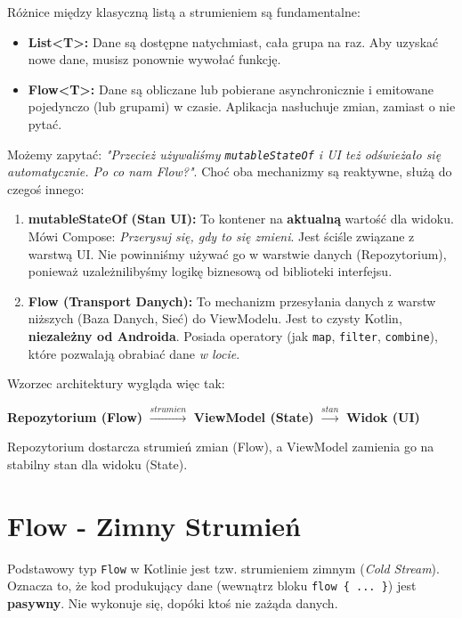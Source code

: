 Różnice między klasyczną listą a strumieniem są fundamentalne:
\begin{itemize}
    \item \textbf{List<T>:} Dane są dostępne natychmiast, cała grupa na raz. Aby uzyskać nowe dane, musisz ponownie wywołać funkcję.
    \item \textbf{Flow<T>:} Dane są obliczane lub pobierane asynchronicznie i emitowane pojedynczo (lub grupami) w czasie. Aplikacja nasłuchuje zmian, zamiast o nie pytać.
\end{itemize}

Możemy zapytać: \textit{"Przecież używaliśmy \texttt{mutableStateOf} i UI też odświeżało się automatycznie. Po co nam Flow?"}. Choć oba mechanizmy są reaktywne, służą do czegoś innego:

\begin{enumerate}
    \item \textbf{mutableStateOf (Stan UI):} To kontener na \textbf{aktualną} wartość dla widoku. Mówi Compose: \textit{Przerysuj się, gdy to się zmieni}. Jest ściśle związane z warstwą UI. Nie powinniśmy używać go w warstwie danych (Repozytorium), ponieważ uzależnilibyśmy logikę biznesową od biblioteki interfejsu.
    
    \item \textbf{Flow (Transport Danych):} To mechanizm przesyłania danych z warstw niższych (Baza Danych, Sieć) do ViewModelu. Jest to czysty Kotlin, \textbf{niezależny od Androida}. Posiada operatory (jak \texttt{map}, \texttt{filter}, \texttt{combine}), które pozwalają obrabiać dane \textit{w locie}.
\end{enumerate}

Wzorzec architektury wygląda więc tak:
\begin{center}
\textbf{Repozytorium (Flow)} $\xrightarrow{strumien}$ \textbf{ViewModel (State)} $\xrightarrow{stan}$ \textbf{Widok (UI)}
\end{center}
Repozytorium dostarcza strumień zmian (Flow), a ViewModel zamienia go na stabilny stan dla widoku (State).

\section{Flow - Zimny Strumień}

Podstawowy typ \texttt{Flow} w Kotlinie jest tzw. strumieniem zimnym (\textit{Cold Stream}). Oznacza to, że kod produkujący dane (wewnątrz bloku \texttt{flow \{ ... \}}) jest \textbf{pasywny}. Nie wykonuje się, dopóki ktoś nie zażąda danych.

